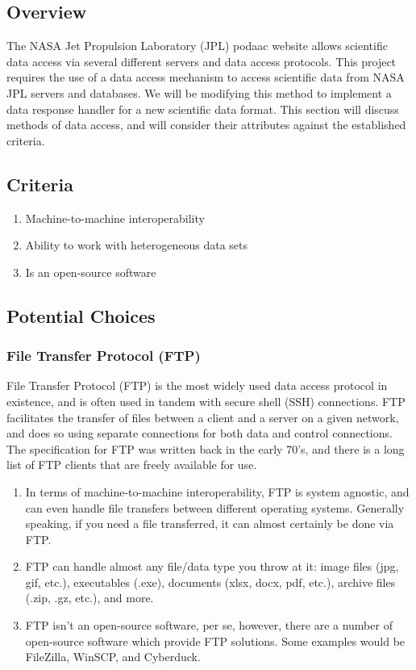 \documentclass[onecolumn, draftclsnofoot,10pt, compsoc]{IEEEtran}
\begin{document}
\subsection{Overview}
The NASA Jet Propulsion Laboratory (JPL) podaac website allows scientific data access via several different servers and data access protocols. This project requires the use of a data access mechanism to access scientific data from NASA JPL servers and databases. We will be modifying this method to implement a data response handler for a new scientific data format. This section will discuss methods of data access, and will consider their attributes against the established criteria.

\subsection{Criteria}
\begin{enumerate}
\item Machine-to-machine interoperability
\item Ability to work with heterogeneous data sets
\item Is an open-source software
\end{enumerate}
\subsection{Potential Choices}

\subsubsection{File Transfer Protocol (FTP)}
File Transfer Protocol (FTP) is the most widely used data access protocol in existence, and is often used in tandem with secure shell (SSH) connections. FTP facilitates the transfer of files between a client and a server on a given network, and does so using separate connections for both data and control connections. The specification for FTP was written back in the early 70's, and there is a long list of FTP clients that are freely available for use. 

\begin{enumerate}
\item In terms of machine-to-machine interoperability, FTP is system agnostic, and can even handle file transfers between different operating systems. Generally speaking, if you need a file transferred, it can almost certainly be done via FTP.
\item FTP can handle almost any file/data type you throw at it: image files (jpg, gif, etc.), executables (.exe), documents (xlsx, docx, pdf, etc.), archive files (.zip, .gz, etc.), and more.
\item FTP isn’t an open-source software, per se, however, there are a number of open-source software which provide FTP solutions. Some examples would be FileZilla, WinSCP, and Cyberduck.
\end{enumerate}
\end{document}
